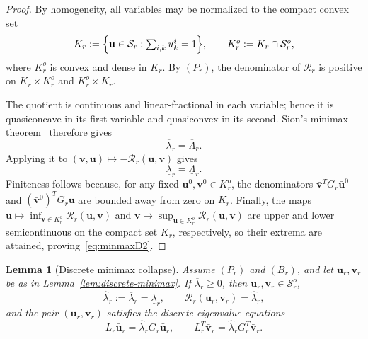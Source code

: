 \documentclass[preprint,10pt]{elsarticle}
\theoremstyle{plain}
\newtheorem{lemma}{Lemma}
\theoremstyle{definition}
\theoremstyle{remark}
\begin{document}
\begin{proof}
	By homogeneity, all variables may be normalized to the compact convex set
	\[
	K_r := \Bigl\{\mathbf{u}\in\mathcal{S}_r :
	\textstyle\sum_{i,k}u_k^i=1\Bigr\},
	\qquad K_r^o := K_r\cap\mathcal{S}_r^o,
	\]
	where $K_r^o$ is convex and dense in $K_r$. By $(P_r)$, the denominator of
	$\mathcal{R}_r$ is positive on $K_r\times K_r^o$ and $K_r^o\times K_r$.
	
	The quotient is continuous and linear-fractional in each variable;
	hence it is quasiconcave in its first variable and quasiconvex in its
	second. Sion's minimax theorem~\cite{Sion1958} therefore gives
	\[
	\overline\lambda_r=\overline\Lambda_r.
	\]
	Applying it to
	\((\mathbf v,\mathbf u)\mapsto-\mathcal R_r(\mathbf u,\mathbf v)\)
	gives
	\[
	\underline\lambda_r=\underline\Lambda_r.
	\]
	Finiteness follows because, for any fixed
	$\mathbf{u}^0,\mathbf{v}^0\in K_r^o$, the denominators
	$\bar{\mathbf{v}}^T G_r\bar{\mathbf{u}}^0$ and
	$(\bar{\mathbf{v}}^0)^T G_r\bar{\mathbf{u}}$ are bounded away from zero on
	$K_r$. Finally, the maps
	$\mathbf{u}\mapsto\inf_{\mathbf{v}\in K_r^o}\mathcal{R}_r(\mathbf{u},\mathbf{v})$
	and $\mathbf{v}\mapsto\sup_{\mathbf{u}\in K_r^o}\mathcal{R}_r(\mathbf{u},\mathbf{v})$
	are upper and lower semicontinuous on the compact set $K_r$, respectively, so
	their extrema are attained, proving~\eqref{eq:minmaxD2}.
\end{proof}

\begin{lemma}[Discrete minimax collapse]\label{lem:discrete-collapse}
	Assume $(P_r)$ and $(B_r)$, and let $\mathbf{u}_r,\mathbf{v}_r$ be as in
	Lemma~\ref{lem:discrete-minimax}. If $\overline\lambda_r\ge0$, then
	$\mathbf{u}_r,\mathbf{v}_r\in\mathcal{S}_r^o$,
	\[
	\hat\lambda_r := \overline\lambda_r = \underline\lambda_r,
	\qquad
	\mathcal{R}_r(\mathbf{u}_r,\mathbf{v}_r) = \hat\lambda_r,
	\]
	and the pair $(\mathbf{u}_r,\mathbf{v}_r)$ satisfies the discrete eigenvalue
	equations
	\begin{equation}\label{eq:uravn}
		L_r\bar{\mathbf{u}}_r = \hat\lambda_r G_r\bar{\mathbf{u}}_r,
		\qquad
		L_r^T\bar{\mathbf{v}}_r = \hat\lambda_r G_r^T\bar{\mathbf{v}}_r.
	\end{equation}
\end{lemma}
\end{document}
